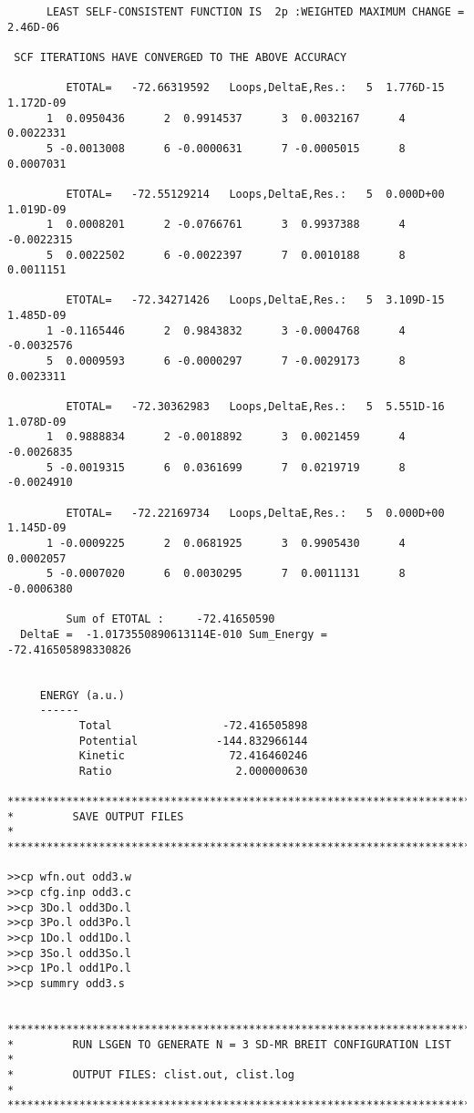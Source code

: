 \documentclass[fleqn,10pt]{book}
\begin{document}
\begin{verbatim}
      LEAST SELF-CONSISTENT FUNCTION IS  2p :WEIGHTED MAXIMUM CHANGE =  2.46D-06

 SCF ITERATIONS HAVE CONVERGED TO THE ABOVE ACCURACY

         ETOTAL=   -72.66319592   Loops,DeltaE,Res.:   5  1.776D-15  1.172D-09
      1  0.0950436      2  0.9914537      3  0.0032167      4  0.0022331
      5 -0.0013008      6 -0.0000631      7 -0.0005015      8  0.0007031

         ETOTAL=   -72.55129214   Loops,DeltaE,Res.:   5  0.000D+00  1.019D-09
      1  0.0008201      2 -0.0766761      3  0.9937388      4 -0.0022315
      5  0.0022502      6 -0.0022397      7  0.0010188      8  0.0011151

         ETOTAL=   -72.34271426   Loops,DeltaE,Res.:   5  3.109D-15  1.485D-09
      1 -0.1165446      2  0.9843832      3 -0.0004768      4 -0.0032576
      5  0.0009593      6 -0.0000297      7 -0.0029173      8  0.0023311

         ETOTAL=   -72.30362983   Loops,DeltaE,Res.:   5  5.551D-16  1.078D-09
      1  0.9888834      2 -0.0018892      3  0.0021459      4 -0.0026835
      5 -0.0019315      6  0.0361699      7  0.0219719      8 -0.0024910

         ETOTAL=   -72.22169734   Loops,DeltaE,Res.:   5  0.000D+00  1.145D-09
      1 -0.0009225      2  0.0681925      3  0.9905430      4  0.0002057
      5 -0.0007020      6  0.0030295      7  0.0011131      8 -0.0006380

         Sum of ETOTAL :     -72.41650590
  DeltaE =  -1.0173550890613114E-010 Sum_Energy =   -72.416505898330826     


     ENERGY (a.u.)
     ------
           Total                 -72.416505898
           Potential            -144.832966144
           Kinetic                72.416460246
           Ratio                   2.000000630

*******************************************************************************
*         SAVE OUTPUT FILES                                                   * 
*******************************************************************************

>>cp wfn.out odd3.w
>>cp cfg.inp odd3.c
>>cp 3Do.l odd3Do.l
>>cp 3Po.l odd3Po.l
>>cp 1Do.l odd1Do.l
>>cp 3So.l odd3So.l
>>cp 1Po.l odd1Po.l
>>cp summry odd3.s


*******************************************************************************
*         RUN LSGEN TO GENERATE N = 3 SD-MR BREIT CONFIGURATION LIST          *
*         OUTPUT FILES: clist.out, clist.log                                  *
*******************************************************************************


\end{verbatim}
\end{document}
